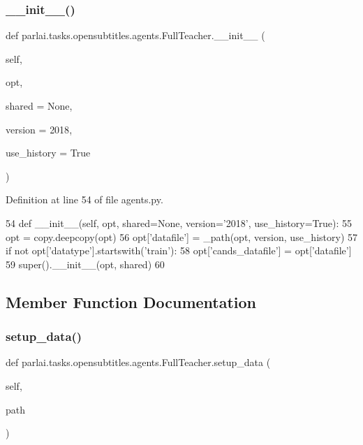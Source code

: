 \subsubsection{\texorpdfstring{\+\_\+\+\_\+init\+\_\+\+\_\+()}{\_\_init\_\_()}}
{\footnotesize\ttfamily def parlai.\+tasks.\+opensubtitles.\+agents.\+Full\+Teacher.\+\_\+\+\_\+init\+\_\+\+\_\+ (\begin{DoxyParamCaption}\item[{}]{self,  }\item[{}]{opt,  }\item[{}]{shared = {\ttfamily None},  }\item[{}]{version = {\ttfamily \textquotesingle{}2018\textquotesingle{}},  }\item[{}]{use\+\_\+history = {\ttfamily True} }\end{DoxyParamCaption})}



Definition at line 54 of file agents.\+py.


\begin{DoxyCode}
54     \textcolor{keyword}{def }\_\_init\_\_(self, opt, shared=None, version='2018', use\_history=True):
55         opt = copy.deepcopy(opt)
56         opt[\textcolor{stringliteral}{'datafile'}] = \_path(opt, version, use\_history)
57         \textcolor{keywordflow}{if} \textcolor{keywordflow}{not} opt[\textcolor{stringliteral}{'datatype'}].startswith(\textcolor{stringliteral}{'train'}):
58             opt[\textcolor{stringliteral}{'cands\_datafile'}] = opt[\textcolor{stringliteral}{'datafile'}]
59         super().\_\_init\_\_(opt, shared)
60 
\end{DoxyCode}


\subsection{Member Function Documentation}
\mbox{\label{classparlai_1_1tasks_1_1opensubtitles_1_1agents_1_1FullTeacher_abd9f716304f56c2b8b7f7573d34c87f6}} 
\subsubsection{\texorpdfstring{setup\+\_\+data()}{setup\_data()}}
{\footnotesize\ttfamily def parlai.\+tasks.\+opensubtitles.\+agents.\+Full\+Teacher.\+setup\+\_\+data (\begin{DoxyParamCaption}\item[{}]{self,  }\item[{}]{path }\end{DoxyParamCaption})}



